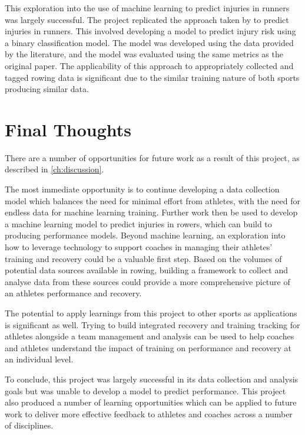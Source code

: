 This exploration into the use of machine learning to predict injuries in runners was largely successful. The project replicated the approach taken by \textcite{Lovdal2021} to predict injuries in runners. This involved developing a model to predict injury risk using a binary classification model. The model was developed using the data provided by the literature, and the model was evaluated using the same metrics as the original paper. The applicability of this approach to appropriately collected and tagged rowing data is significant due to the similar training nature of both sports producing similar data.

\section{Final Thoughts}
There are a number of opportunities for future work as a result of this project, as described in \autoref{ch:discussion}. 

The most immediate opportunity is to continue developing a data collection model which balances the need for minimal effort from athletes, with the need for endless data for machine learning training. Further work then be used to develop a machine learning model to predict injuries in rowers, which can build to producing performance models. Beyond machine learning, an exploration into how to leverage technology to support coaches in managing their athletes' training and recovery could be a valuable first step. Based on the volumes of potential data sources available in rowing, building a framework to collect and analyse data from these sources could provide a more comprehensive picture of an athletes performance and recovery.

The potential to apply learnings from this project to other sports as applications is significant as well. Trying to build integrated recovery and training tracking for athletes alongside a team management and analysis can be used to help coaches and athletes understand the impact of training on performance and recovery at an individual level.

To conclude, this project was largely successful in its data collection and analysis goals but was unable to develop a model to predict performance. This project also produced a number of learning opportunities which can be applied to future work to deliver more effective feedback to athletes and coaches across a number of disciplines.